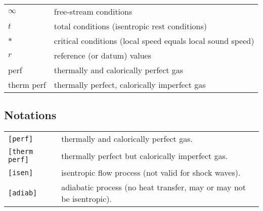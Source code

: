 \begin{flushleft}
\renewcommand{\arraystretch}{1.3}
\begin{tabular}{ll}
$\infty$ & free-stream conditions \\
$t$ & total conditions (isentropic rest conditions) \\
$*$ & critical conditions (local speed equals local sound speed) \\
$r$ & reference (or datum) values \\
perf & thermally and calorically perfect gas \\
therm perf & thermally perfect, calorically imperfect gas \\
\end{tabular}
\end{flushleft}

\subsection*{Notations}

\begin{flushleft}
\renewcommand{\arraystretch}{1.3}
\begin{tabular}{ll}
    \texttt{[perf]} & thermally and calorically perfect gas. \\
    \texttt{[therm perf]} & thermally perfect but calorically imperfect gas.\\
    \texttt{[isen]} & isentropic flow process (not valid for shock waves).\\
    \texttt{[adiab]} & adiabatic process (no heat transfer, may or may not be isentropic).\\
\end{tabular}
\end{flushleft}
